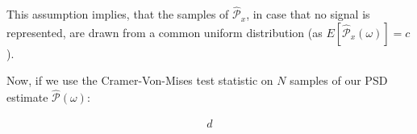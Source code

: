 \documentclass[a4paper, openany, oneside]{memoir}
\begin{document}
This assumption implies, that the samples of $\hat{\mathcal{P}}_x$, in case that no signal is represented, are drawn from a common uniform distribution (as $E[\hat{\mathcal{P}}_x(\omega)] = c$).

Now, if we use the Cramer-Von-Mises test statistic on $N$ samples of our PSD estimate $\hat{\mathcal{P}}(\omega)$:

\begin{align*}
d
\end{align*}










\end{document}
